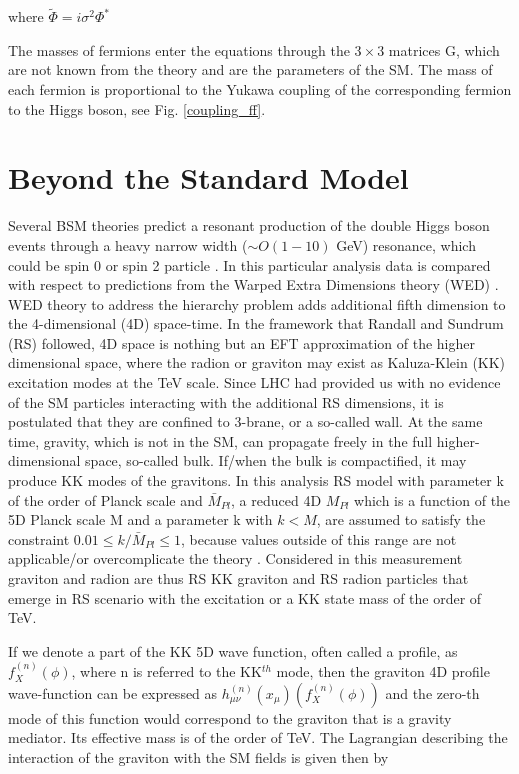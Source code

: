 where $\tilde{\Phi} = i \sigma^2 \Phi^*$

The masses of fermions enter the equations through the $3 \times 3$ matrices G, which are not known from the theory and are the parameters of the SM. The mass of each fermion is proportional to the Yukawa coupling of the corresponding fermion to the Higgs boson, see Fig. \ref{coupling_ff}.

\section{Beyond the Standard Model}

Several BSM theories \cite{Huang:2017nnw, Dolan:2012ac, Kanemura:2016tan} predict a resonant production of the double Higgs boson events through a heavy narrow width ($\sim O(1-10)$ GeV) resonance, which could be spin 0 or spin 2 particle \cite{Sirunyan:2018iwt}. In this particular analysis data is compared with respect to predictions from the Warped Extra Dimensions theory (WED) \cite{Oliveira:2014kla}. WED theory to address the hierarchy problem adds additional fifth dimension to the 4-dimensional (4D) space-time. In the framework that Randall and Sundrum (RS) \cite{Randall:1999ee} followed, 4D space is nothing but an EFT approximation of the higher dimensional space, where the radion or graviton may exist as Kaluza-Klein (KK) \cite{Uzawa:1999pg} excitation modes at the TeV scale. Since LHC had provided us with no evidence of the SM particles interacting with the additional RS dimensions, it is postulated that they are confined to 3-brane, or a so-called wall. At the same time, gravity, which is not in the SM, can propagate freely in the full higher-dimensional space, so-called bulk. If/when the bulk is compactified, it may produce KK modes of the gravitons. In this analysis RS model with parameter k of the order of Planck scale and $\bar{M}_{Pl}$, a reduced 4D $M_{Pl}$ which is a function of the 5D Planck scale M and a parameter k with $k<M$, are assumed to satisfy the constraint $0.01 \leq k / \bar{M}_{Pl} \leq 1$, because values outside of this range are not applicable/or overcomplicate the theory \cite{Davoudiasl:1999jd}. Considered in this measurement graviton and radion are thus RS KK graviton and RS radion particles that emerge in RS scenario with the excitation or a KK state mass of the order of TeV. 

If we denote a part of the KK 5D wave function, often called a profile, as $f^{(n)}_X(\phi)$, where n is referred to the KK$^{th}$ mode, then the graviton 4D profile wave-function can be expressed as $h^{(n)}_{\mu\nu}(x_\mu)(f^{(n)}_X(\phi))$ and the zero-th mode of this function would correspond to the graviton that is a gravity mediator. Its effective mass is of the order of TeV. The Lagrangian describing the interaction of the graviton with the SM fields is given then by 

